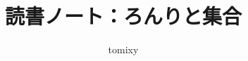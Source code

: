 \documentclass[b5paper,17pt,twocolumn]{jsarticle}
\title{読書ノート：ろんりと集合}
\author{tomixy}
\begin{document}
\maketitle
\tableofcontents

\br






\end{document}
